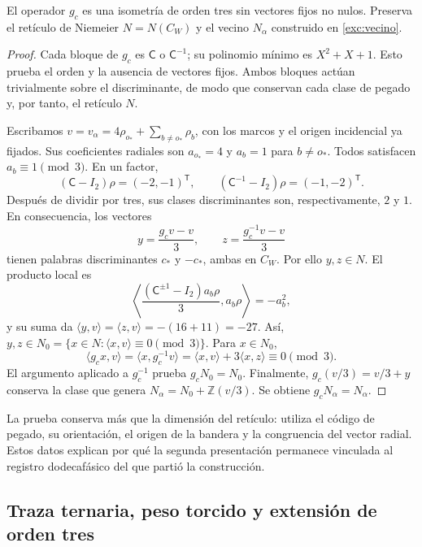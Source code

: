 \begin{proposition}
\label{km:estabilidad-vecino}
El operador \(g_c\) es una isometría de orden tres sin vectores fijos
no nulos. Preserva el retículo de Niemeier \(N=N(C_W)\) y el vecino
\(N_\alpha\) construido en \eqref{exc:vecino}.
\end{proposition}
\begin{proof}
Cada bloque de \(g_c\) es \(\mathsf C\) o \(\mathsf C^{-1}\);
su polinomio mínimo es \(X^2+X+1\). Esto prueba el orden y la
ausencia de vectores fijos. Ambos bloques actúan trivialmente sobre el
discriminante, de modo que conservan cada clase de pegado y, por tanto,
el retículo \(N\).

Escribamos \(v=v_\alpha=4\rho_{o_*}+\sum_{b\ne o_*}\rho_b\),
con los marcos y el origen incidencial ya fijados. Sus coeficientes
radiales son \(a_{o_*}=4\) y \(a_b=1\) para \(b\ne o_*\).
Todos satisfacen \(a_b\equiv1\pmod3\). En un factor,
\[
 (\mathsf C-I_2)\rho=(-2,-1)^{\mathsf T},\qquad
 (\mathsf C^{-1}-I_2)\rho=(-1,-2)^{\mathsf T}.
\]
Después de dividir por tres, sus clases discriminantes son,
respectivamente, \(2\) y \(1\). En consecuencia, los vectores
\begin{equation}
 y=\frac{g_cv-v}{3},\qquad z=\frac{g_c^{-1}v-v}{3}
 \label{km:desplazamientos}
\end{equation}
tienen palabras discriminantes \(c_*\) y \(-c_*\), ambas en
\(C_W\). Por ello \(y,z\in N\). El producto local es
\[
 \left\langle
 \frac{(\mathsf C^{\pm1}-I_2)a_b\rho}{3},a_b\rho
 \right\rangle=-a_b^2,
\]
y su suma da
\(\langle y,v\rangle=\langle z,v\rangle=-(16+11)=-27\).
Así, \(y,z\in N_0=\{x\in N:\langle x,v\rangle\equiv0\pmod3\}\).
Para \(x\in N_0\),
\[
 \langle g_cx,v\rangle
 =\langle x,g_c^{-1}v\rangle
 =\langle x,v\rangle+3\langle x,z\rangle\equiv0\pmod3.
\]
El argumento aplicado a \(g_c^{-1}\) prueba \(g_cN_0=N_0\).
Finalmente, \(g_c(v/3)=v/3+y\) conserva la clase que genera
\(N_\alpha=N_0+\mathbb Z(v/3)\). Se obtiene
\(g_cN_\alpha=N_\alpha\).
\end{proof}

La prueba conserva más que la dimensión del retículo: utiliza el código
de pegado, su orientación, el origen de la bandera y la congruencia del
vector radial. Estos datos explican por qué la segunda presentación
permanece vinculada al registro dodecafásico del que partió la construcción.

\subsection{Traza ternaria, peso torcido y extensión de orden tres}
\label{km:orbifold-tres}

